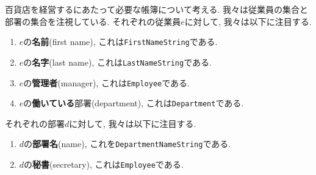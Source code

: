 \begin{example}\label{ex:department store 1}


百貨店を経営するにあたって必要な帳簿について考える. 我々は従業員の集合と部署の集合を注視している. それぞれの従業員$e$に対して, 我々は以下に注目する.
\begin{enumerate}[\hsp E.1\;]
\item $e$の\textbf{名前}(first name), これは\texttt{FirstNameString}である.
\item $e$の\textbf{名字}(last name), これは\texttt{LastNameString}である.
\item $e$の\textbf{管理者}(manager), これは\texttt{Employee}である.
\item $e$の\textbf{働いている}部署(department), これは\texttt{Department}である.
\end{enumerate}
それぞれの部署$d$に対して, 我々は以下に注目する.
\begin{enumerate}[\hsp D.1\;]
\item $d$の\textbf{部署名}(name), これを\texttt{DepartmentNameString}である.
\item $d$の\textbf{秘書}(secretary), これは\texttt{Employee}である.
\end{enumerate}



\end{example}
